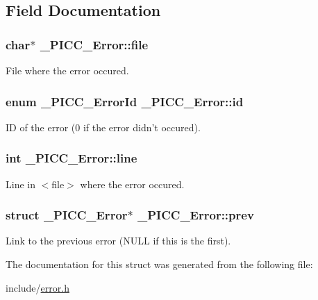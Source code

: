 \subsection{Field Documentation}
\hypertarget{struct__PICC__Error_a01b9647a32f60a82c99b3b332387c7e4}{
\subsubsection[{file}]{\setlength{\rightskip}{0pt plus 5cm}char$\ast$ \-\_\-\-P\-I\-C\-C\-\_\-\-Error\-::file}}\label{struct__PICC__Error_a01b9647a32f60a82c99b3b332387c7e4}
File where the error occured. \hypertarget{struct__PICC__Error_a35acbe51828a7168e5173904bd734c88}{
\subsubsection[{id}]{\setlength{\rightskip}{0pt plus 5cm}enum {\bf \-\_\-\-P\-I\-C\-C\-\_\-\-Error\-Id} \-\_\-\-P\-I\-C\-C\-\_\-\-Error\-::id}}\label{struct__PICC__Error_a35acbe51828a7168e5173904bd734c88}
I\-D of the error (0 if the error didn't occured). \hypertarget{struct__PICC__Error_ac2f7d3e5215d6835458fabe4c08cdaf5}{
\subsubsection[{line}]{\setlength{\rightskip}{0pt plus 5cm}int \-\_\-\-P\-I\-C\-C\-\_\-\-Error\-::line}}\label{struct__PICC__Error_ac2f7d3e5215d6835458fabe4c08cdaf5}
Line in $<$file$>$ where the error occured. \hypertarget{struct__PICC__Error_a6a8e88acb1b847cdf6984c1600d2cef6}{
\subsubsection[{prev}]{\setlength{\rightskip}{0pt plus 5cm}struct {\bf \-\_\-\-P\-I\-C\-C\-\_\-\-Error}$\ast$ \-\_\-\-P\-I\-C\-C\-\_\-\-Error\-::prev}}\label{struct__PICC__Error_a6a8e88acb1b847cdf6984c1600d2cef6}
Link to the previous error (N\-U\-L\-L if this is the first). 

The documentation for this struct was generated from the following file\-:\begin{DoxyCompactItemize}
\item 
include/\hyperlink{error_8h}{error.\-h}\end{DoxyCompactItemize}

